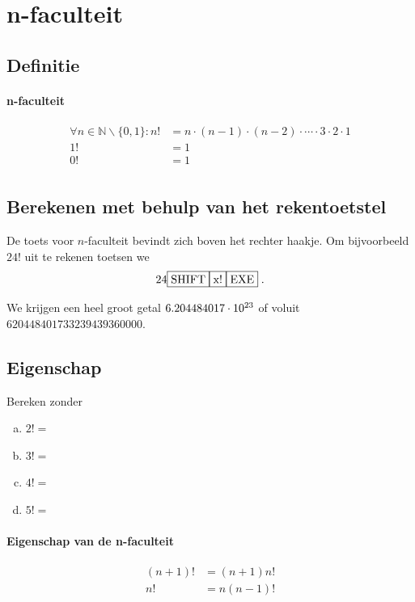 \documentclass[12pt,twoside]{article}
\begin{document}
\pagebreak
\section{n-faculteit}

\begin{theorie}

\subsection{Definitie}

\paragraph*{n-faculteit}
\begin{mdframed}
\begin{align*}
\forall n \in \mathbb{N}\backslash\{0,1\}: n!&=n\cdot(n-1)\cdot(n-2)\cdot \cdots \cdot 3\cdot2\cdot1\\
                                           1!&=1\\
                                           0!&=1\\
\end{align*}
\end{mdframed}

\subsection{Berekenen met behulp van het rekentoetstel}

De toets voor $n$-faculteit bevindt zich boven het rechter haakje. Om bijvoorbeeld $24!$ uit te rekenen toetsen we
$$24 \zrm{SHIFT} \zrm{x!} \zrm{EXE}\;.$$

We krijgen een heel groot getal $6.204484017\cdot 10^{23}$ of voluit $620448401733239439360000$.

\subsection{Eigenschap}

Bereken zonder 
\begin{enumerate}[(a)]
  \item $2!=$\arulefill
  \item $3!=$\arulefill{}
  \item $4!=$\arulefill{}
  \item $5!=$\arulefill{}
\end{enumerate}

\paragraph*{Eigenschap van de n-faculteit}
\begin{mdframed}
\begin{align*}
  (n+1)!&=(n+1)n!\\
  n!&=n(n-1)!\\
\end{align*}
\end{mdframed}

\end{theorie}
\end{document}
